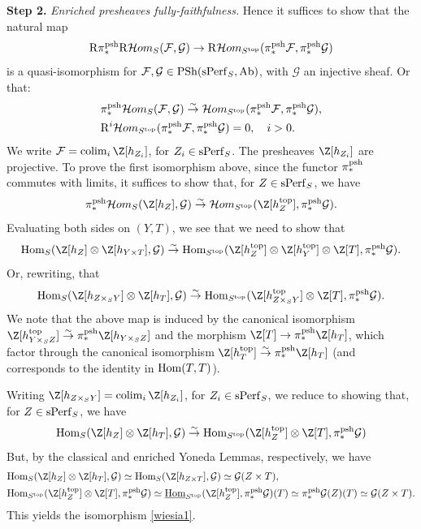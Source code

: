 \documentclass[10pt]{amsart}
\let\cal\mathcal
\theoremstyle{definition}
\theoremstyle{remark}
\newcommand{\colim}{\operatorname{colim} }
\newcommand{\Hom}{{\rm{Hom}} }
\newcommand{\uHom}{\underline{{\rm{Hom}} }}
\newcommand{\Hhom}{{\cal Hom}}
\newcommand{\sff}{{\mathcal{F}}}
\newcommand{\sg}{{\mathcal{G}}}
\numberwithin{equation}{section}
\def\R{{\mathrm R}}
\numberwithin{equation}{section}
\begin{document}
  {\bf Step 2.} {\em Enriched  presheaves fully-faithfulness.}  Hence it suffices to show that the natural map
\begin{equation*}\label{cieplo1}
\R\pi_*^{\rm psh}\R\Hhom_{S}(\sff,\sg)\to \R\Hhom_{S^{\rm top}}(\pi^{\rm psh}_*\sff,\pi^{\rm psh}_*\sg)
\end{equation*}
is a quasi-isomorphism for $\sff, \sg\in {\rm PSh}({\rm sPerf}_S,{\rm Ab})$, with $\sg$  an injective sheaf. 
     Or  that:
\begin{align}\label{zimno11}
 &  \pi^{\rm psh}_{*}\Hhom_{S}(\sff,\sg)\stackrel{\sim}{\to} \Hhom_{S^{\rm top}}(\pi^{\rm psh}_{*}\sff,\pi^{\rm psh}_{*}\sg),\\
 &  \R^i\Hhom_{S^{\rm top}}(\pi^{\rm psh}_{*}\sff,\pi^{\rm psh}_{*}\sg)=0,\quad i>0.\notag
\end{align}
We write  $\sff =\colim_i\Z[h_{Z_i}]$, for $Z_i\in {\rm sPerf}_S$. The presheaves $\Z[h_{Z_i}]$ are projective. To prove the first isomorphism above,  since  the functor  $\pi^{\rm psh}_{*}$ commutes with limits, 
        it suffices  to show that, for $Z\in {\rm sPerf}_S$, we have 
  $$
  \pi^{\rm psh}_{*}\Hhom_{S}(\Z[h_Z],\sg)\stackrel{\sim}{\to} \Hhom_{S^{\rm top}}(\Z[h^{\rm top}_Z],\pi^{\rm psh}_{*}\sg).
  $$
   Evaluating both sides on $(Y,T)$, we see that we need to show that
  $$
    \Hom_{S}(\Z[h_{Z}]\otimes \Z[ h_{Y\times T}],\sg)\stackrel{\sim}{\to} \Hom_{S^{\rm top}}(\Z[h^{\rm top}_Z]\otimes\Z[h^{\rm top}_Y]\otimes\Z[T],\pi^{\rm psh}_{*}\sg).
  $$
  Or, rewriting, that 
  $$
      \Hom_{S}(\Z[h_{Z\times_S Y}]\otimes \Z[ h_{T}],\sg)\stackrel{\sim}{\to} \Hom_{S^{\rm top}}(\Z[h^{\rm top}_{Z\times_S Y}]\otimes\Z[T],\pi^{\rm psh}_{*}\sg).
  $$
 We note that the above map is  induced by the canonical isomorphism $\Z[h^{\rm top}_{Y\times_SZ}]\stackrel{\sim}{\to} \pi^{\rm psh}_{*}\Z[h_{Y\times_SZ}]$ and the morphism 
 $\Z[T]\to \pi^{\rm psh}_{*}\Z[h_T]$, which  factor through the canonical isomorphism $\Z[h^{\rm top}_{T}]\stackrel{\sim}{\to} \pi^{\rm psh}_{*}\Z[h_{T}]$ (and corresponds to the identity
in $\Hom(T,T)$). 

       Writing $\Z[h_{Z\times _SY}]=\colim_i\Z[h_{Z_i}]$, for $Z_i\in {\rm sPerf}_S$, we reduce to showing that, for $Z\in {\rm sPerf}_S$, we have
\begin{equation}\label{wiesia1}
      \Hom_{S}(\Z[h_{Z}]\otimes \Z[ h_{T}],\sg)\stackrel{\sim}{\to} \Hom_{S^{\rm top}}(\Z[h^{\rm top}_{Z}]\otimes\Z[T],\pi^{\rm psh}_{*}\sg)
  \end{equation}
  But, by the classical and enriched Yoneda Lemmas, respectively, we have
    \begin{align*}
   & \Hom_{S}(\Z[h_{Z}]\otimes \Z[ h_{ T}],\sg)  \simeq   \Hom_{S}(\Z[h_{Z\times T}],\sg)\simeq \sg(Z\times T),\\
   & \Hom_{S^{\rm top}}(\Z[h^{\rm top}_Z]\otimes\Z[T],\pi^{\rm psh}_{*}\sg)\simeq \uHom_{S^{\rm top}}(\Z[h^{\rm top}_Z],\pi^{\rm psh}_{*}\sg)(T)\simeq
    \pi^{\rm psh}_{*}\sg(Z)(T)\simeq \sg(Z\times T).
  \end{align*}
This yields the isomorphism \eqref{wiesia1}.  
  
\end{document}
